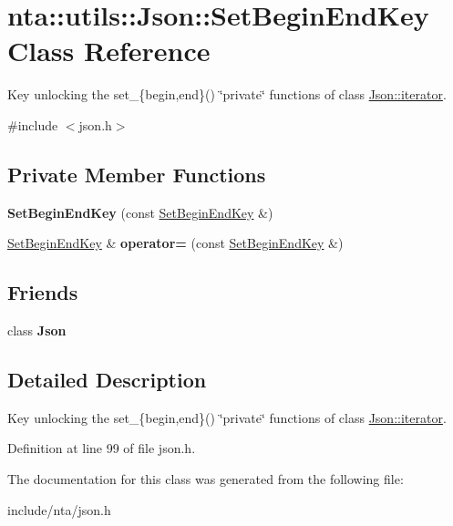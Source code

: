 \hypertarget{classnta_1_1utils_1_1Json_1_1SetBeginEndKey}{}\section{nta\+:\+:utils\+:\+:Json\+:\+:Set\+Begin\+End\+Key Class Reference}
\label{classnta_1_1utils_1_1Json_1_1SetBeginEndKey}


Key unlocking the set\+\_\+\{begin,end\}() \char`\"{}private\char`\"{} functions of class \hyperlink{classnta_1_1utils_1_1Json_1_1iterator}{Json\+::iterator}.  




{\ttfamily \#include $<$json.\+h$>$}

\subsection*{Private Member Functions}
\begin{DoxyCompactItemize}
\item 
\mbox{\label{classnta_1_1utils_1_1Json_1_1SetBeginEndKey_a8b763786a663ac1f4480536569502b03}} 
{\bfseries Set\+Begin\+End\+Key} (const \hyperlink{classnta_1_1utils_1_1Json_1_1SetBeginEndKey}{Set\+Begin\+End\+Key} \&)
\item 
\mbox{\label{classnta_1_1utils_1_1Json_1_1SetBeginEndKey_acedfb4474597563556da2ae4df424e5e}} 
\hyperlink{classnta_1_1utils_1_1Json_1_1SetBeginEndKey}{Set\+Begin\+End\+Key} \& {\bfseries operator=} (const \hyperlink{classnta_1_1utils_1_1Json_1_1SetBeginEndKey}{Set\+Begin\+End\+Key} \&)
\end{DoxyCompactItemize}
\subsection*{Friends}
\begin{DoxyCompactItemize}
\item 
\mbox{\label{classnta_1_1utils_1_1Json_1_1SetBeginEndKey_a7dd8a79e9210a2a230d000eee63c6e8a}} 
class {\bfseries Json}
\end{DoxyCompactItemize}


\subsection{Detailed Description}
Key unlocking the set\+\_\+\{begin,end\}() \char`\"{}private\char`\"{} functions of class \hyperlink{classnta_1_1utils_1_1Json_1_1iterator}{Json\+::iterator}. 

Definition at line 99 of file json.\+h.



The documentation for this class was generated from the following file\+:\begin{DoxyCompactItemize}
\item 
include/nta/json.\+h\end{DoxyCompactItemize}
